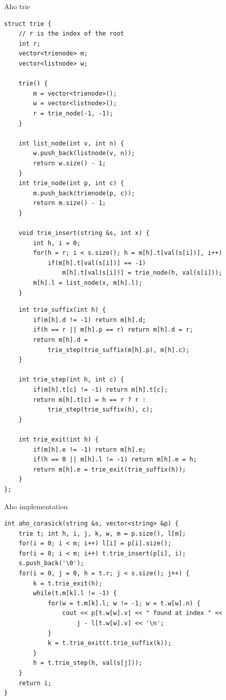 \documentclass{beamer}
\begin{document}
\begin{frame}{Aho trie}
    \tiny
    \begin{multicols}{2}
    \begin{verbatim}
struct trie { 
    // r is the index of the root
    int r;
    vector<trienode> m;
    vector<listnode> w;

    trie() {
        m = vector<trienode>();
        w = vector<listnode>();
        r = trie_node(-1, -1);
    }

    int list_node(int v, int n) {
        w.push_back(listnode(v, n));
        return w.size() - 1;
    }
    int trie_node(int p, int c) {
        m.push_back(trienode(p, c));
        return m.size() - 1;
    }

    void trie_insert(string &s, int x) {
        int h, i = 0;
        for(h = r; i < s.size(); h = m[h].t[val(s[i])], i++)
            if(m[h].t[val(s[i])] == -1)
                m[h].t[val(s[i])] = trie_node(h, val(s[i]));
        m[h].l = list_node(x, m[h].l);
    }
    \end{verbatim}
    \columnbreak
    \begin{verbatim}
    int trie_suffix(int h) {
        if(m[h].d != -1) return m[h].d;
        if(h == r || m[h].p == r) return m[h].d = r;
        return m[h].d = 
            trie_step(trie_suffix(m[h].p), m[h].c);
    }

    int trie_step(int h, int c) {
        if(m[h].t[c] != -1) return m[h].t[c];
        return m[h].t[c] = h == r ? r :
            trie_step(trie_suffix(h), c);
    }

    int trie_exit(int h) {
        if(m[h].e != -1) return m[h].e;
        if(h == 0 || m[h].l != -1) return m[h].e = h;
        return m[h].e = trie_exit(trie_suffix(h));
    }
};
    \end{verbatim}
    \end{multicols}
\end{frame}

\begin{frame}{Aho implementation}
    \vspace{-25pt}
    \scriptsize
    \begin{verbatim}
int aho_corasick(string &s, vector<string> &p) {
    trie t; int h, i, j, k, w, m = p.size(), l[m];
    for(i = 0; i < m; i++) l[i] = p[i].size();
    for(i = 0; i < m; i++) t.trie_insert(p[i], i);
    s.push_back('\0');
    for(i = 0, j = 0, h = t.r; j < s.size(); j++) {
        k = t.trie_exit(h);
        while(t.m[k].l != -1) {
            for(w = t.m[k].l; w != -1; w = t.w[w].n) {
                cout << p[t.w[w].v] << " found at index " << 
                    j - l[t.w[w].v] << '\n';
            }
            k = t.trie_exit(t.trie_suffix(k));
        }
        h = t.trie_step(h, val(s[j]));
    }
    return i;
}
    \end{verbatim}
\end{frame}
\end{document}
